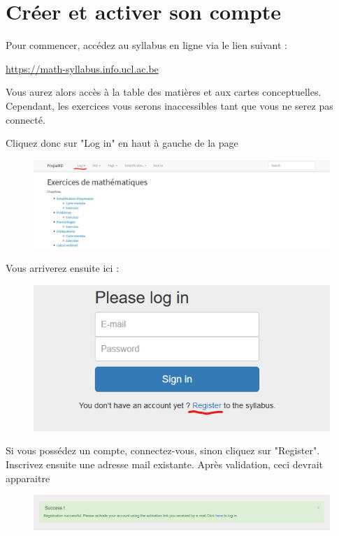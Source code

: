 \documentclass{article}
\begin{document}


\section{Créer et activer son compte}

Pour commencer, accédez au syllabus en ligne via le lien suivant :

\bigskip
\url{https://math-syllabus.info.ucl.ac.be}
\bigskip

Vous aurez alors accès à la table des matières et aux cartes conceptuelles. Cependant, les exercices vous serons inaccessibles tant que vous ne serez pas connecté. 

Cliquez donc sur "Log in" en haut à gauche de la page 

\begin{figure}[!htb]
    \centering
    \includegraphics[scale=0.4]{images/login.png}
\end{figure}

Vous arriverez ensuite ici :

\begin{figure}[!htb]
    \centering
    \includegraphics[scale=0.5]{images/register.png}
\end{figure}

Si vous possédez un compte, connectez-vous, sinon cliquez sur "Register". Inscrivez ensuite une adresse mail existante. Après validation, ceci devrait apparaitre

\begin{figure}[!htb]
    \centering
    \includegraphics[scale=0.5]{images/mail.png}
\end{figure}
\end{document}
